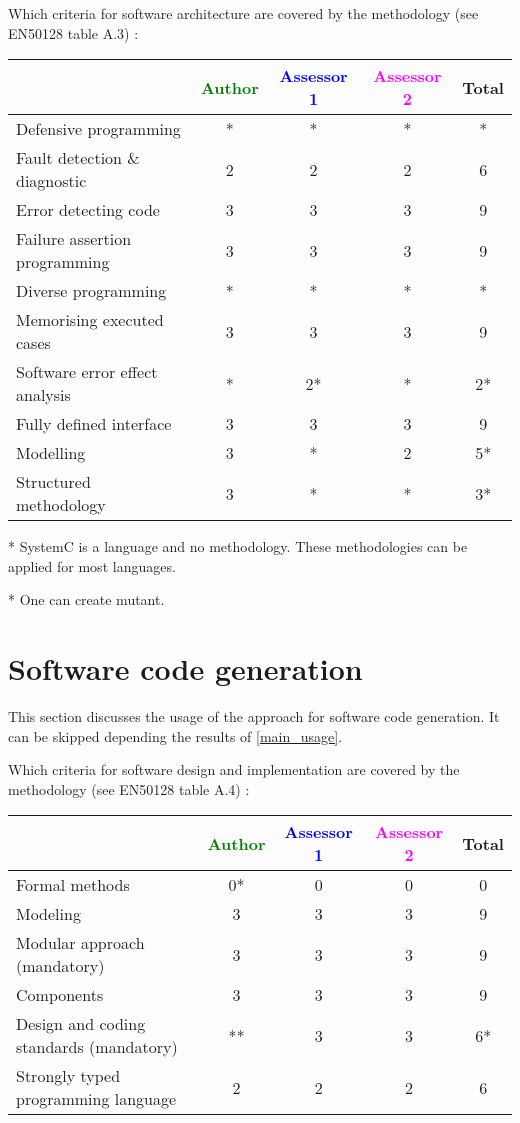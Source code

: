 Which criteria for software architecture are covered by the methodology
(see EN50128 table A.3) :

\begin{tabular}{|l | c | c | c | c|}
\hline
& \textcolor{green}{Author} & \textcolor{blue}{Assessor 1} & \textcolor{magenta}{Assessor 2} & Total \\
\hline
Defensive programming &* &* & * & * \\
\hline
Fault detection \& diagnostic &2 &2 &2 & 6 \\
\hline
Error detecting code &3 &3 &3 & 9 \\
\hline
Failure assertion programming &3 &3 &3 & 9 \\
\hline
Diverse programming &* &* & * & * \\
\hline
Memorising executed cases &3 &3 &3 & 9 \\
\hline
Software error effect analysis &* &2* & * & 2* \\
\hline
Fully defined interface &3 &3 &3 & 9\\
\hline
Modelling &3 & * &2 & 5* \\
\hline
Structured methodology &3 & * & * & 3* \\
\hline
\end{tabular}

\begin{author_comment}
 * SystemC is a language and no methodology. These methodologies can be applied for most languages.
\end{author_comment}
\begin{assessor1}
* One can create mutant.
\end{assessor1}

\section{Software code generation}
This section discusses the usage of the approach for software code generation.
It can be skipped depending the results of \ref{main_usage}.

Which criteria for software design and implementation are covered by the methodology
(see EN50128 table A.4) :

\begin{tabular}{|l | c | c | c | c|}
\hline
& \textcolor{green}{Author} & \textcolor{blue}{Assessor 1} & \textcolor{magenta}{Assessor 2} & Total \\
\hline
Formal methods &0* &0 &0 & 0 \\
\hline
Modeling &3 &3 &3 & 9\\
\hline
Modular approach (mandatory) &3 &3 &3 & 9 \\
\hline
Components &3 &3 &3 & 9 \\
\hline
Design and coding standards (mandatory) &** &3 &3 & 6* \\
\hline
Strongly typed programming language &2 &2 &2 & 6 \\
\hline

\end{tabular}


